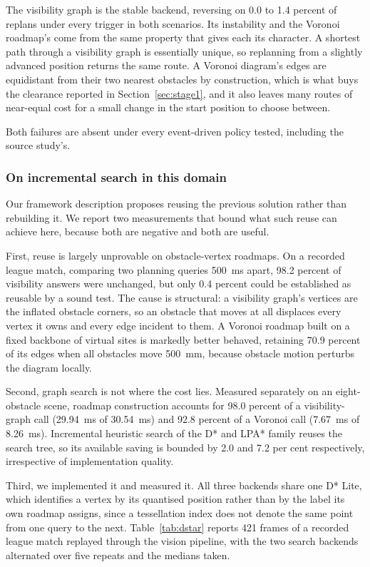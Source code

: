 The visibility graph is the stable backend, reversing on 0.0 to 1.4 percent of
replans under every trigger in both scenarios. Its instability and the Voronoi roadmap's
come from the same property that gives each its character. A shortest path
through a visibility graph is essentially unique, so replanning from a slightly
advanced position returns the same route. A Voronoi diagram's edges are
equidistant from their two nearest obstacles by construction, which is what
buys the clearance reported in Section~\ref{sec:stage1}, and it also leaves many
routes of near-equal cost for a small change in the start position to choose
between.

Both failures are absent under every event-driven policy tested, including the
source study's.

\subsubsection{On incremental search in this domain}

Our framework description proposes reusing the previous solution rather than
rebuilding it. We report two measurements that bound what such reuse can
achieve here, because both are negative and both are useful.

First, reuse is largely unprovable on obstacle-vertex roadmaps. On a recorded
league match, comparing two planning queries 500~ms apart, 98.2 percent of
visibility answers were unchanged, but only 0.4 percent could be established as
reusable by a sound test. The cause is structural: a visibility graph's
vertices are the inflated obstacle corners, so an obstacle that moves at all
displaces every vertex it owns and every edge incident to them. A Voronoi
roadmap built on a fixed backbone of virtual sites is markedly better behaved,
retaining 70.9 percent of its edges when all obstacles move 500~mm, because
obstacle motion perturbs the diagram locally.

Second, graph search is not where the cost lies. Measured separately on an
eight-obstacle scene, roadmap construction accounts for 98.0 percent of a
visibility-graph call (29.94~ms of 30.54~ms) and 92.8 percent of a Voronoi call
(7.67~ms of 8.26~ms). Incremental heuristic search of the D* and LPA* family
reuses the search tree, so its available saving is bounded by 2.0 and 7.2 per
cent respectively, irrespective of implementation quality.

Third, we implemented it and measured it. All three backends share one D* Lite,
which identifies a vertex by its quantised position rather than by the label its
own roadmap assigns, since a tessellation index does not denote the same point
from one query to the next. Table~\ref{tab:dstar} reports 421 frames of a
recorded league match replayed through the vision pipeline, with the two search
backends alternated over five repeats and the medians taken.

